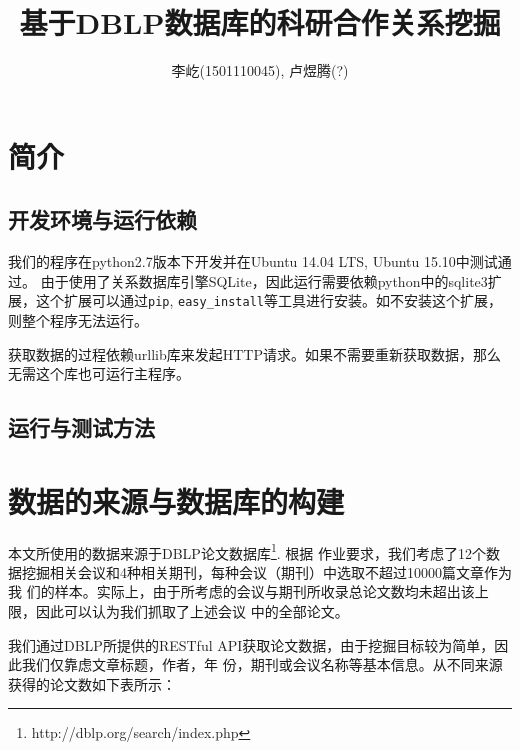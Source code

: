 \documentclass[a4paper]{article}
\title{基于DBLP数据库的科研合作关系挖掘}
\author{李屹(1501110045), 卢煜腾(?)}
\begin{document}
\maketitle

\section{简介}
\subsection{开发环境与运行依赖}
我们的程序在python2.7版本下开发并在Ubuntu 14.04 LTS, Ubuntu 15.10中测试通过。
由于使用了关系数据库引擎SQLite，因此运行需要依赖python中的sqlite3扩展，这个扩展可以通过\texttt{pip},
\texttt{easy\_install}等工具进行安装。如不安装这个扩展，则整个程序无法运行。

获取数据的过程依赖urllib库来发起HTTP请求。如果不需要重新获取数据，那么无需这个库也可运行主程序。

\subsection{运行与测试方法}

\section{数据的来源与数据库的构建}
本文所使用的数据来源于DBLP论文数据库\footnote{http://dblp.org/search/index.php}. 根据
作业要求，我们考虑了12个数据挖掘相关会议和4种相关期刊，每种会议（期刊）中选取不超过10000篇文章作为我
们的样本。实际上，由于所考虑的会议与期刊所收录总论文数均未超出该上限，因此可以认为我们抓取了上述会议
中的全部论文。

我们通过DBLP所提供的RESTful API获取论文数据，由于挖掘目标较为简单，因此我们仅靠虑文章标题，作者，年
份，期刊或会议名称等基本信息。从不同来源获得的论文数如下表所示：
\end{document}
